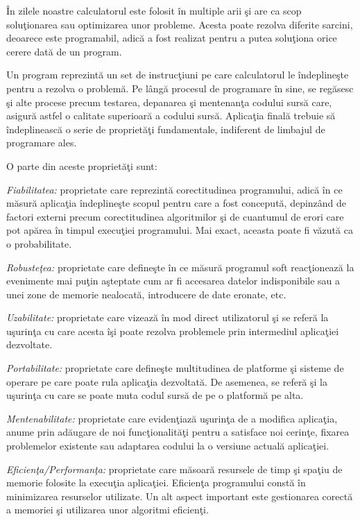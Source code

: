 \^{I}n zilele noastre calculatorul este folosit \^{i}n multiple arii \c{s}i are ca scop solu\c{t}ionarea sau optimizarea unor probleme. Acesta poate rezolva diferite sarcini, deoarece este programabil, adic\u{a} a fost realizat pentru a putea solu\c{t}iona orice cerere dat\u{a} de un program.

Un program reprezint\u{a} un set de instruc\c{t}iuni pe care calculatorul le \^{i}ndepline\c{s}te pentru a rezolva o problem\u{a}. Pe l\^{a}ng\u{a} procesul de programare \^{i}n sine, se reg\u{a}sesc \c{s}i alte procese precum testarea, depanarea \c{s}i mentenan\c{t}a codului surs\u{a} care, asigur\u{a} astfel o calitate superioar\u{a} a codului surs\u{a}. Aplica\c{t}ia final\u{a} trebuie s\u{a} \^{i}ndeplineasc\u{a} o serie de propriet\u{a}\c{t}i fundamentale, indiferent de limbajul de programare ales.
 
O parte din aceste propriet\u{a}\c{t}i sunt:

\begin{enumerate}
	\utb \textit{Fiabilitatea:} proprietate care reprezint\u{a} corectitudinea programului, adic\u{a} \^{i}n ce m\u{a}sur\u{a} aplica\c{t}ia \^{i}ndepline\c{s}te scopul pentru care a fost conceput\u{a}, depinz\^{a}nd de factori externi precum corectitudinea algoritmilor \c{s}i de cuantumul de erori care pot ap\u{a}rea \^{i}n timpul execu\c{t}iei programului. Mai exact, aceasta poate fi v\u{a}zut\u{a} ca o probabilitate.
	
	\utb \textit{Robuste\c{t}ea:} proprietate care define\c{s}te \^{i}n ce m\u{a}sur\u{a} programul soft reacţioneaz\u{a} la evenimente mai pu\c{t}in a\c{s}teptate cum ar fi accesarea datelor indisponibile sau a unei zone de memorie nealocat\u{a}, introducere de date eronate, etc.
	
	\utb \textit{Uzabilitate:} proprietate care vizeaz\u{a} \^{i}n mod direct utilizatorul \c{s}i se refer\u{a} la u\c{s}urin\c{t}a cu care acesta \^{i}şi poate rezolva problemele prin intermediul aplica\c{t}iei dezvoltate.
	
	\utb \textit{Portabilitate:} proprietate care define\c{s}te multitudinea de platforme \c{s}i sisteme de operare pe care poate rula aplica\c{t}ia dezvoltat\u{a}. De asemenea, se refer\u{a} \c{s}i la uşurin\c{t}a cu care se poate muta codul surs\u{a} de pe o platform\u{a} pe alta.
	
	\utb \textit{Mentenabilitate:} proprietate care eviden\c{t}iaz\u{a} u\c{s}urin\c{t}a de a modifica aplica\c{t}ia, anume prin ad\u{a}ugare de noi funcţionalit\u{a}\c{t}i pentru a satisface noi cerin\c{t}e, fixarea problemelor existente sau adaptarea codului la o versiune actual\u{a} aplica\c{t}iei.
	
	\utb \textit{Eficien\c{t}a/Performan\c{t}a:} proprietate care m\u{a}soar\u{a} resursele de timp \c{s}i spa\c{t}iu de memorie folosite la execu\c{t}ia aplica\c{t}iei. Eficien\c{t}a programului const\u{a} \^{i}n minimizarea resurselor utilizate. Un alt aspect important este gestionarea corect\u{a} a memoriei \c{s}i utilizarea unor algoritmi eficien\c{t}i.
\end{enumerate}

